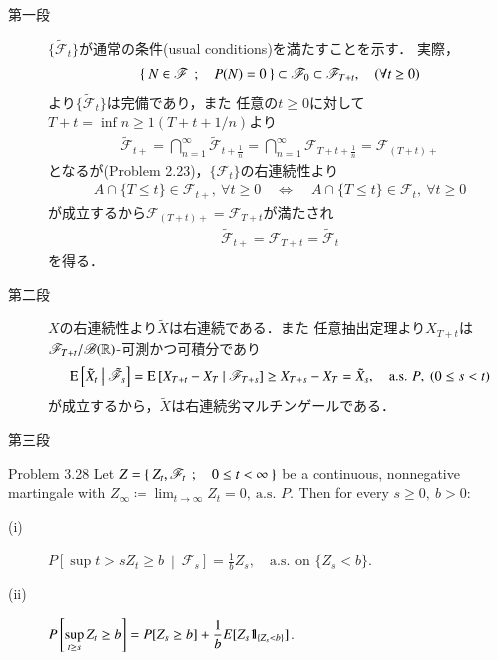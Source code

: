 	\begin{prf}\mbox{}
		\begin{description}
			\item[第一段]
				$\{\tilde{\mathscr{F}}_t\}$が通常の条件(usual conditions)を満たすことを示す．
				実際，
				\begin{align}
					\left\{\ N \in \mathscr{F}\ \, ; \quad P(N)=0\ \right\} 
					\subset \mathscr{F}_0 \subset \mathscr{F}_{T+t},
					\quad (\forall t \geq 0)
				\end{align}
				より$\{\tilde{\mathscr{F}}_t\}$は完備であり，また
				任意の$t \geq 0$に対して$T+t = \inf{n \geq 1}{(T+t+1/n)}$より
				\begin{align}
					\tilde{\mathscr{F}}_{t+}
					= \bigcap_{n=1}^\infty \tilde{\mathscr{F}}_{t+\frac{1}{n}}
					= \bigcap_{n=1}^\infty \mathscr{F}_{T+t+\frac{1}{n}}
					= \mathscr{F}_{(T+t)+}
				\end{align}
				となるが(Problem 2.23)，$\{\mathscr{F}_t\}$の右連続性より
				\begin{align}
					A \cap \{T \leq t\} \in \mathscr{F}_{t+},
					\ \forall t \geq 0
					\quad \Leftrightarrow \quad
					A \cap \{T \leq t\} \in \mathscr{F}_t,
					\ \forall t \geq 0
				\end{align}
				が成立するから$\mathscr{F}_{(T+t)+} = \mathscr{F}_{T+t}$が満たされ
				\begin{align}
					\tilde{\mathscr{F}}_{t+} = \mathscr{F}_{T+t} = \tilde{\mathscr{F}}_{t}
				\end{align}
				を得る．
				
			\item[第二段]
				$X$の右連続性より$\tilde{X}$は右連続である．また
				任意抽出定理より$X_{T+t}$は$\mathscr{F}_{T+t}/\mathscr{B}(\mathbb{R})$-可測かつ可積分であり
				\begin{align}
					\operatorname{E} \left[ \tilde{X}_t \ \middle|\ \tilde{\mathscr{F}}_s \right]
					= \operatorname{E} \left[ X_{T+t} - X_T \ \middle|\ \mathscr{F}_{T+s} \right]
					\geq X_{T+s} - X_T
					= \tilde{X}_s,
					\quad \mbox{a.s. $P$},
					\ (0 \leq s < t)
				\end{align}
				が成立するから，$\tilde{X}$は右連続劣マルチンゲールである．
				
			\item[第三段]
		\end{description}
	\end{prf}
	
	\begin{itembox}[l]{Problem 3.28}
		Let $Z = \left\{\ Z_t,\mathscr{F}_t\ \, ; \quad 0 \leq t < \infty\ \right\}$ be a continuous, nonnegative martingale with
		$Z_\infty \coloneqq \lim_{t \to \infty} Z_t = 0,\ \mbox{a.s. $P$}$. Then for every $s \geq 0,\ b > 0$:
		\begin{description}
			\item[(i)] $\displaystyle P\left[ \sup{t>s}{Z_t \geq b}\ \middle|\ \mathscr{F}_s \right] = \frac{1}{b} Z_s,
				\quad \mbox{a.s. on $\{Z_s < b\}$}$.
			\item[(ii)] $\displaystyle P\left[ \operatorname*{sup}_{t \geq s} Z_t \geq b \right] = P[Z_s \geq b] + \frac{1}{b} E[Z_s \mbox{1}\hspace{-0.25em}\mbox{l}_{\{Z_s < b\}}]$.
		\end{description}
	\end{itembox}
	
